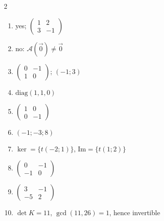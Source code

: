\begin{multicols}{2}\raggedright
\begin{enumerate}[label=\arabic*., leftmargin=*, itemsep=1pt]
\item yes; $\left(\begin{smallmatrix}1&2\\3&-1\end{smallmatrix}\right)$
\item no: $\mathcal A(\vec 0)\ne\vec 0$
\item $\left(\begin{smallmatrix}0&-1\\1&0\end{smallmatrix}\right)$; $(-1;3)$
\item $\mathrm{diag}(1,1,0)$
\item $\left(\begin{smallmatrix}1&0\\0&-1\end{smallmatrix}\right)$
\item $(-1;-3;8)$
\item $\ker=\{t(-2;1)\}$, $\mathrm{Im}=\{t(1;2)\}$
\item $\left(\begin{smallmatrix}0&-1\\-1&0\end{smallmatrix}\right)$
\item $\left(\begin{smallmatrix}3&-1\\-5&2\end{smallmatrix}\right)$
\item $\det K=11$, $\gcd(11,26)=1$, hence invertible
\end{enumerate}
\end{multicols}
